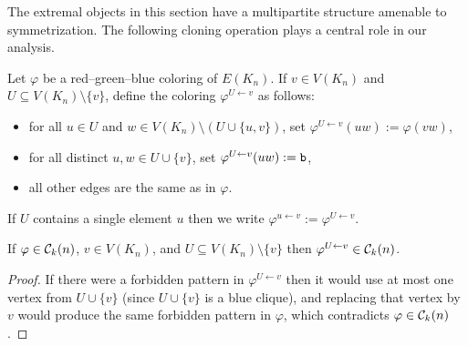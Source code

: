 The extremal objects in this section have a multipartite structure amenable to symmetrization. The following cloning operation plays a central role in our analysis.

\begin{definition}[Cloning]\label{dfn:cloning}
Let $\varphi$ be a red--green--blue coloring of $E(K_n)$. If $v\in V(K_n)$ and $U\subseteq V(K_n)\setminus\{v\}$, define the coloring $\varphi^{U\gets v}$ as follows:
\begin{itemize}[leftmargin=\parindent, topsep=4pt]
    \item for all $u\in U$ and $w\in V(K_n)\setminus(U\cup\{u,v\})$, set $\varphi^{U\gets v}(uw):=\varphi(vw)$,
    \item for all distinct $u,w\in U\cup\{v\}$, set $\varphi^{U\gets v}(uw):={\normalfont\texttt b}$,
    \item all other edges are the same as in $\varphi$.
\end{itemize}
If $U$ contains a single element $u$ then we write $\varphi^{u\gets v}:=\varphi^{U\gets v}$.
\end{definition}

\begin{fact}\label{fact:cloning-keeps-ckn}
If $\varphi\in{\mathcal C}_k(n)$, $v\in V(K_n)$, and $U\subseteq V(K_n)\setminus\{v\}$ then $\varphi^{U\gets v}\in{\mathcal C}_k(n)$.
\end{fact}
\begin{proof}
If there were a forbidden pattern in $\varphi^{U\gets v}$ then it would use at most one vertex from $U\cup\{v\}$ (since $U\cup\{v\}$ is a blue clique), and replacing that vertex by $v$ would produce the same forbidden pattern in $\varphi$, which contradicts $\varphi\in{\mathcal C}_k(n)$.
\end{proof}

